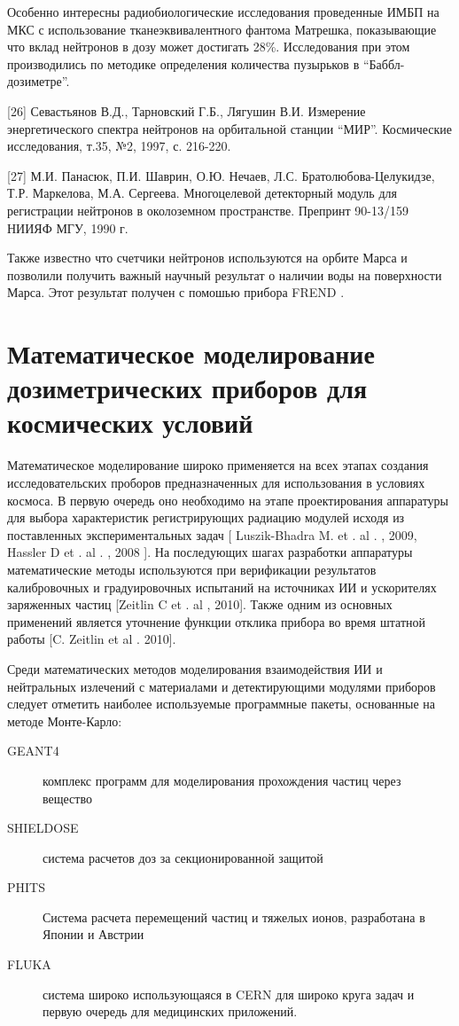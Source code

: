 Особенно интересны радиобиологические исследования проведенные ИМБП \cite{Shurshakov2016} на МКС с использование тканеэквивалентного фантома Матрешка, показывающие что вклад нейтронов в дозу может достигать 28\%.  Исследования при этом производились по методике определения количества пузырьков в ``Баббл-дозиметре''.

[26]  Севастьянов В.Д., Тарновский Г.Б., Лягушин В.И.  Измерение энергетического спектра нейтронов на орбитальной станции “МИР”.  Космические исследования, т.35, №2, 1997, с. 216-220.

[27]  М.И. Панасюк, П.И. Шаврин, О.Ю. Нечаев, Л.С. Братолюбова-Целукидзе, Т.Р. Маркелова, М.А. Сергеева. Многоцелевой детекторный модуль для регистрации нейтронов в околоземном пространстве. Препринт 90-13/159 НИИЯФ МГУ, 1990 г.

Также известно что счетчики нейтронов используются на орбите Марса и позволили получить важный научный результат о наличии воды на поверхности Марса.  Этот  результат получен с помошью прибора FREND \cite{Sanin2012}.

\section{Математическое моделирование дозиметрических приборов для космических условий}

Математическое моделирование широко применяется на всех этапах создания исследовательских проборов предназначенных для использования в условиях космоса. В первую очередь оно необходимо на этапе проектирования аппаратуры для выбора характеристик регистрирующих радиацию модулей исходя из поставленных экспериментальных задач [ Luszik-Bhadra M.  et . al . ,  2009,  Hassler  D et .  al . ,  2008 ]. На последующих шагах разработки аппаратуры математические методы используются при верификации результатов калибровочных и градуировочных испытаний на источниках ИИ и ускорителях заряженных частиц [Zeitlin C et . al ,  2010]. Также одним из основных применений является уточнение функции отклика прибора во время штатной работы [C. Zeitlin et al . 2010]. 


Среди математических методов моделирования взаимодействия ИИ и нейтральных излечений с материалами и детектирующими модулями приборов следует отметить наиболее используемые программные пакеты, основанные на методе Монте-Карло:


\begin{description}
	\item[GEANT4] комплекс программ для моделирования прохождения частиц через вещество\cite{Allison2006}
	\item[SHIELDOSE ] система расчетов доз за секционированной защитой \cite{SeltzerS.M.1980}
	\item[PHITS] Система расчета перемещений частиц и тяжелых ионов, 
	разработана в Японии и Австрии%
	\item[FLUKA] система широко использующаяся в CERN для широко круга задач и 
	первую очередь для медицинских приложений\cite{Fasso2003, fluka2014}.
\end{description}

